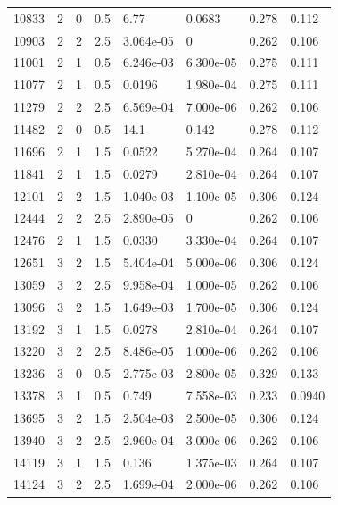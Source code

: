 \documentclass[preview]{standalone}
\begin{document}
{{{\begin{tabular}{L{1.2cm}C{1.2cm} C{0.3cm}C{0.5cm} C{1.4cm}C{1.4cm} C{1.4cm}C{1.4cm}}
  10833  &     2  & 0     & 0.5 &  6.77  & 0.0683  & 0.278 &  0.112   \\ 
  10903  &     2  & 2     & 2.5 &  3.064e-05  & 0  & 0.262 &  0.106   \\ 
  11001  &     2  & 1     & 0.5 &  6.246e-03  & 6.300e-05  & 0.275 &  0.111   \\ 
  11077  &     2  & 1     & 0.5 &  0.0196  & 1.980e-04  & 0.275 &  0.111   \\ 
  11279  &     2  & 2     & 2.5 &  6.569e-04  & 7.000e-06  & 0.262 &  0.106   \\ 
  11482  &     2  & 0     & 0.5 &  14.1  & 0.142  & 0.278 &  0.112   \\ 
  11696  &     2  & 1     & 1.5 &  0.0522  & 5.270e-04  & 0.264 &  0.107   \\ 
  11841  &     2  & 1     & 1.5 &  0.0279  & 2.810e-04  & 0.264 &  0.107   \\ 
  12101  &     2  & 2     & 1.5 &  1.040e-03  & 1.100e-05  & 0.306 &  0.124   \\ 
  12444  &     2  & 2     & 2.5 &  2.890e-05  & 0  & 0.262 &  0.106   \\ 
  12476  &     2  & 1     & 1.5 &  0.0330  & 3.330e-04  & 0.264 &  0.107   \\ 
  12651  &     3  & 2     & 1.5 &  5.404e-04  & 5.000e-06  & 0.306 &  0.124   \\ 
  13059  &     3  & 2     & 2.5 &  9.958e-04  & 1.000e-05  & 0.262 &  0.106   \\ 
  13096  &     3  & 2     & 1.5 &  1.649e-03  & 1.700e-05  & 0.306 &  0.124   \\ 
  13192  &     3  & 1     & 1.5 &  0.0278  & 2.810e-04  & 0.264 &  0.107   \\ 
  13220  &     3  & 2     & 2.5 &  8.486e-05  & 1.000e-06  & 0.262 &  0.106   \\ 
  13236  &     3  & 0     & 0.5 &  2.775e-03  & 2.800e-05  & 0.329 &  0.133   \\ 
  13378  &     3  & 1     & 0.5 &  0.749  & 7.558e-03  & 0.233 &  0.0940   \\ 
  13695  &     3  & 2     & 1.5 &  2.504e-03  & 2.500e-05  & 0.306 &  0.124   \\ 
  13940  &     3  & 2     & 2.5 &  2.960e-04  & 3.000e-06  & 0.262 &  0.106   \\ 
  14119  &     3  & 1     & 1.5 &  0.136  & 1.375e-03  & 0.264 &  0.107   \\ 
  14124  &     3  & 2     & 2.5 &  1.699e-04  & 2.000e-06  & 0.262 &  0.106   \\ 

\end{tabular}}}}
\end{document}

